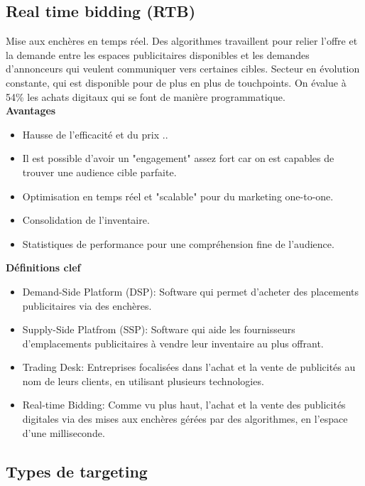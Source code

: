 \subsection{Real time bidding (RTB)}

Mise aux enchères en temps réel. Des algorithmes travaillent pour relier l'offre et la demande entre les espaces publicitaires disponibles et les demandes d'annonceurs qui veulent communiquer vers certaines cibles. Secteur en évolution constante, qui est disponible pour de plus en plus de touchpoints. On évalue à 54\% les achats digitaux qui se font de manière programmatique.\\

\textbf{Avantages}

\begin{itemize}
    \item Hausse de l'efficacité et du prix ..
    \item Il est possible d'avoir un "engagement" assez fort car on est capables de trouver une audience cible parfaite.
    \item Optimisation en temps réel et "scalable" pour du marketing one-to-one.
    \item Consolidation de l'inventaire.
    \item Statistiques de performance pour une compréhension fine de l'audience.\\
\end{itemize}

\textbf{Définitions clef}

\begin{itemize}
    \item Demand-Side Platform (DSP): Software qui permet d'acheter des placements publicitaires via des enchères.
    \item Supply-Side Platfrom (SSP): Software qui aide les fournisseurs d'emplacements publicitaires à vendre leur inventaire au plus offrant.
    \item Trading Desk: Entreprises focalisées dans l'achat et la vente de publicités au nom de leurs clients, en utilisant plusieurs technologies.
    \item Real-time Bidding: Comme vu plus haut, l'achat et la vente des publicités digitales via des mises aux enchères gérées par des algorithmes, en l'espace d'une milliseconde.\\
\end{itemize}

\subsection{Types de targeting}

